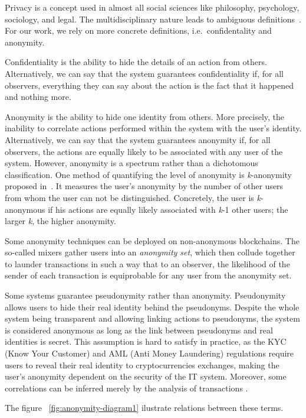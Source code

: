 \documentclass{ieeeaccess}
\begin{document}
Privacy is a concept used in almost all social sciences like philosophy, psychology, sociology, and legal. The multidisciplinary nature leads to ambiguous definitions~\cite{smith2011information}. For our work, we rely on more concrete definitions, i.e.~confidentality and anonymity.

Confidentiality is the ability to hide the details of an action from others. Alternatively, we can say that the system guarantees confidentiality if, for all observers, everything they can say about the action is the fact that it happened and nothing more.

Anonymity is the ability to hide one identity from others. More precisely, the inability to correlate actions performed within the system with the user's identity. Alternatively, we can say that the system guarantees anonymity if, for all observers, the actions are equally likely to be associated with any user of the system. However, anonymity is a spectrum rather than a dichotomous classification. One method of quantifying the level of anonymity is \textit{k}-anonymity proposed in~\cite{sweeney2002k}. It measures the user's anonymity by the number of other users from whom the user can not be distinguished. Concretely, the user is \textit{k}-anonymous if his actions are equally likely associated with \textit{k}-1 other users; the larger \textit{k}, the higher anonymity.

Some anonymity techniques can be deployed on non-anonymous blockchains. The so-called mixers gather users into an \textit{anonymity set}, which then collude together to launder transactions in such a way that to an observer, the likelihood of the sender of each transaction is equiprobable for any user from the anonymity set.

Some systems guarantee pseudonymity rather than anonymity. Pseudonymity allows users to hide their real identity behind the pseudonyms. Despite the whole system being transparent and allowing linking actions to pseudonyms, the system is considered anonymous as long as the link between pseudonyms and real identities is secret. This assumption is hard to satisfy in practice, as the KYC (Know Your Customer) and AML (Anti Money Laundering) regulations require users to reveal their real identity to cryptocurrencies exchanges, making the user's anonymity dependent on the security of the IT system. Moreover, some correlations can be inferred merely by the analysis of transactions \cite{androulaki2013evaluating, ober2013structure}.

The figure ~\ref{fig:anonymity-diagram1} ilustrate relations between these terms.
\end{document}
